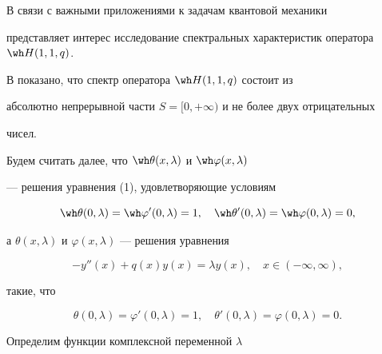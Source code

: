 В связи с важными приложениями к задачам квантовой механики \cite{1} 


представляет интерес исследование спектральных характеристик оператора $\wh 


H(1,1,q)$. 


 


В \cite{2} показано, что спектр оператора $\wh H(1,1,q)$ состоит из 


абсолютно непрерывной части $S=[0,+\infty)$ и не более двух отрицательных 


чисел. 


 


Будем считать далее, что $\wh\theta(x,\lambda)$ и $\wh\varphi(x,\lambda)$ 


--- решения уравнения (1), удовлетворяющие условиям 


$$ 


\wh\theta(0,\lambda)=\wh\varphi{}'(0,\lambda)=1,\quad 


\wh\theta{}'(0,\lambda)=\wh\varphi(0,\lambda)=0, 


$$ 


а $\theta(x,\lambda)$ и $\varphi(x,\lambda)$ --- решения уравнения 


$$ 


-y''(x)+q(x)y(x)=\lambda y(x),\quad 


x\in(-\infty,\infty), 


$$ 


такие, что 


$$ 


\theta(0,\lambda)=\varphi'(0,\lambda)=1,\quad 


\theta'(0,\lambda)=\varphi(0,\lambda)=0. 


$$ 


 


Определим функции комплексной переменной $\lambda$ 


